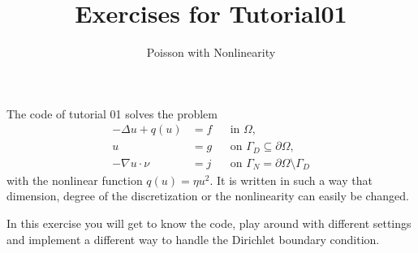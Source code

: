 \documentclass[12pt,a4paper]{article}
\title{\textbf{Exercises for Tutorial01}}
\subtitle{Poisson with Nonlinearity}
\begin{document}
\exerciseheader

The code of tutorial 01 solves the problem
\begin{align*}
  -\Delta u + q(u) &= f &&\text{in $\Omega$},\\
  u &= g &&\text{on $\Gamma_D\subseteq\partial\Omega$},\\
  -\nabla u\cdot \nu &= j &&\text{on $\Gamma_N=\partial\Omega\setminus\Gamma_D$}
\end{align*}
with the nonlinear function $q(u)=\eta u^2$.  It is written in such
a way that dimension, degree of the discretization or the
nonlinearity can easily be changed.

In this exercise you will get to know the code, play around with
different settings and implement a different way to handle the
Dirichlet boundary condition.
\end{document}
